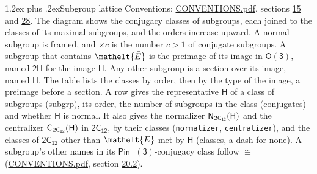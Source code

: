 \documentclass[10pt,a4paper]{article}
\makeatletter
\renewcommand\section{\@startsection{section}{1}{\z@}{-3ex plus -1ex minus -.2ex}%
  {1.2ex plus .2ex}{\normalfont\large\sffamily\bfseries\color{parttitle}}}
\numberwithin{equation}{section}
\newcommand{\eltfont}[1]{{\let\sigma\eltsigma\mathelt{#1}}}
\newcommand{\grp}[1]{\mathsf{#1}}
\newcommand{\cls}[1]{\eltfont{#1}}
\newcommand{\elt}[1]{\eltfont{#1}}
\newcommand{\samecls}{\cong}
\newcommand{\barred}[1]{\bar{#1}}
\newcommand{\hairsp}{\mkern1mu}
\makeatother
\begin{document}
\section{Subgroup lattice}\label{s:subgroups}
Conventions: \href{../../CONVENTIONS.pdf}{CONVENTIONS.pdf}, sections \href{../../../rotation/CONVENTIONS.pdf\#conv.15}{15} and \href{../../CONVENTIONS.pdf\#conv.28}{28}.
The diagram shows the conjugacy classes of subgroups, each joined to the classes of its maximal subgroups, and the orders increase upward. \label{n:index.conjugates.c}A normal subgroup is framed, and ${\times}c$ is the number $c > 1$ of conjugate subgroups. \label{n:group.H}A subgroup that contains $\elt{\barred{E}}$ is the preimage of its image in $\grp{O(3)}$, named $\grp{2H}$ for the image $\grp{H}$. Any other subgroup is a section over its image, named $\grp{H}$. The table lists the classes by order, then by the type of the image, a preimage before a section. \label{n:head.subgroup}\label{n:head.order}\label{n:head.conjugates}\label{n:head.normal}A row gives the representative $\grp{H}$ of a class of subgroups (subgrp), its order, the number of subgroups in the class (conjugates) and whether $\grp{H}$ is normal. \label{n:group.normalizer}\label{n:group.centralizer}\label{n:head.classes}It also gives the normalizer $\grp{N}_{\hairsp \grp{2C_{12}}}(\grp{H})$ and the centralizer $\grp{C}_{\hairsp \grp{2C_{12}}}(\grp{H})$ in $\grp{2C_{12}}$, by their classes (\texttt{normalizer}, \texttt{centralizer}), and the classes of $\grp{2C_{12}}$ other than $\cls{E}$ met by $\grp{H}$ (classes, a dash for none). A subgroup's other names in its \href{Pinminus3.pdf}{$\grp{Pin^{-}(3)}$}-conjugacy class follow $\samecls$ (\href{../../CONVENTIONS.pdf}{CONVENTIONS.pdf}, section \href{../../CONVENTIONS.pdf\#conv.20.2}{20.2}).
\begin{center}
\end{center}
\end{document}

